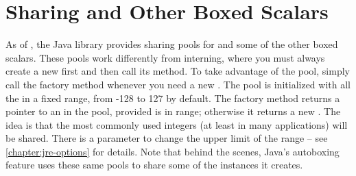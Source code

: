 \section{Sharing  and Other Boxed Scalars}

As of \javafive, the Java library provides sharing pools for
 and some of the other boxed scalars. These pools
work differently from  interning, where you must always create a
new  first and then call its  method. To take
advantage of the  pool, simply call the factory method
 whenever you need a new .
The  pool is initialized with all the  in a fixed
range, from -128 to 127 by default. The factory method returns a
pointer to an  in the pool, provided  is in
range; otherwise it returns a new . 
The idea is  that the most commonly
used integers (at least in many applications) will be shared. There is a
parameter to change the upper limit of the range -- see
\autoref{chapter:jre-options} for details. Note that
behind the scenes, Java's autoboxing feature uses these same pools
to share some of the instances it creates.



